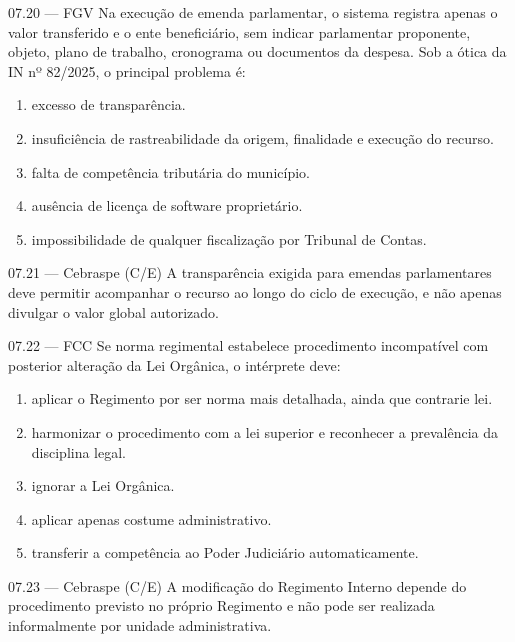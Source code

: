 \begin{questao}{ 07.20 — FGV}
Na execução de emenda parlamentar, o sistema registra apenas o valor transferido e o ente beneficiário, sem indicar parlamentar proponente, objeto, plano de trabalho, cronograma ou documentos da despesa. Sob a ótica da IN nº 82/2025, o principal problema é:
\begin{enumerate}[label=\Alph*)]
\item excesso de transparência.
\item insuficiência de rastreabilidade da origem, finalidade e execução do recurso.
\item falta de competência tributária do município.
\item ausência de licença de software proprietário.
\item impossibilidade de qualquer fiscalização por Tribunal de Contas.
\end{enumerate}
\end{questao}

\begin{questao}{ 07.21 — Cebraspe (C/E)}
A transparência exigida para emendas parlamentares deve permitir acompanhar o recurso ao longo do ciclo de execução, e não apenas divulgar o valor global autorizado.
\end{questao}

\begin{questao}{ 07.22 — FCC}
Se norma regimental estabelece procedimento incompatível com posterior alteração da Lei Orgânica, o intérprete deve:
\begin{enumerate}[label=\Alph*)]
\item aplicar o Regimento por ser norma mais detalhada, ainda que contrarie lei.
\item harmonizar o procedimento com a lei superior e reconhecer a prevalência da disciplina legal.
\item ignorar a Lei Orgânica.
\item aplicar apenas costume administrativo.
\item transferir a competência ao Poder Judiciário automaticamente.
\end{enumerate}
\end{questao}

\begin{questao}{ 07.23 — Cebraspe (C/E)}
A modificação do Regimento Interno depende do procedimento previsto no próprio Regimento e não pode ser realizada informalmente por unidade administrativa.
\end{questao}

